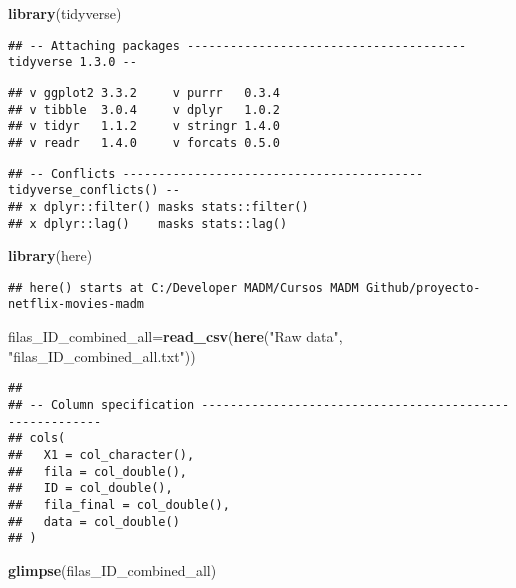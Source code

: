 \documentclass[
]{article}
\newenvironment{Shaded}{\begin{snugshade}}{\end{snugshade}}
\newcommand{\KeywordTok}[1]{\textcolor[rgb]{0.13,0.29,0.53}{\textbf{#1}}}
\newcommand{\NormalTok}[1]{#1}
\newcommand{\StringTok}[1]{\textcolor[rgb]{0.31,0.60,0.02}{#1}}
\begin{document}
\begin{Shaded}
\begin{Highlighting}[]
\KeywordTok{library}\NormalTok{(tidyverse)}
\end{Highlighting}
\end{Shaded}

\begin{verbatim}
## -- Attaching packages --------------------------------------- tidyverse 1.3.0 --
\end{verbatim}

\begin{verbatim}
## v ggplot2 3.3.2     v purrr   0.3.4
## v tibble  3.0.4     v dplyr   1.0.2
## v tidyr   1.1.2     v stringr 1.4.0
## v readr   1.4.0     v forcats 0.5.0
\end{verbatim}

\begin{verbatim}
## -- Conflicts ------------------------------------------ tidyverse_conflicts() --
## x dplyr::filter() masks stats::filter()
## x dplyr::lag()    masks stats::lag()
\end{verbatim}

\begin{Shaded}
\begin{Highlighting}[]
\KeywordTok{library}\NormalTok{(here)}
\end{Highlighting}
\end{Shaded}

\begin{verbatim}
## here() starts at C:/Developer MADM/Cursos MADM Github/proyecto-netflix-movies-madm
\end{verbatim}

\begin{Shaded}
\begin{Highlighting}[]
\NormalTok{filas_ID_combined_all=}\KeywordTok{read_csv}\NormalTok{(}\KeywordTok{here}\NormalTok{(}\StringTok{"Raw data"}\NormalTok{, }\StringTok{"filas_ID_combined_all.txt"}\NormalTok{))}
\end{Highlighting}
\end{Shaded}

\begin{verbatim}
## 
## -- Column specification --------------------------------------------------------
## cols(
##   X1 = col_character(),
##   fila = col_double(),
##   ID = col_double(),
##   fila_final = col_double(),
##   data = col_double()
## )
\end{verbatim}

\begin{Shaded}
\begin{Highlighting}[]
\KeywordTok{glimpse}\NormalTok{(filas_ID_combined_all)}
\end{Highlighting}
\end{Shaded}
\end{document}
